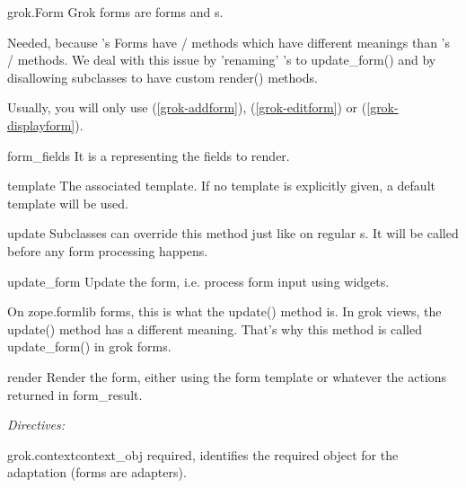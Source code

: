     \begin{classdesc*}{grok.Form}
        Grok forms are  forms and
        s.

        Needed, because 's
        Forms have / methods which have
        different meanings than 's
        / methods.  We deal with this issue
        by 'renaming' 's  to
        update_form() and by disallowing subclasses to have custom
        render() methods. 

        Usually, you will only use 
        (\ref{grok-addform}), 
        (\ref{grok-editform}) or 
        (\ref{grok-displayform}).


        \begin{memberdesc}{form_fields}
          It is a  representing the fields to
          render.
        \end{memberdesc}

        \begin{memberdesc}{template}
            The associated template. If no template is explicitly
            given, a default template will be used.
        \end{memberdesc}

        \begin{methoddesc}{update}{}
          Subclasses can override this method just like on regular
          s. It will be called before any form
          processing happens.
        \end{methoddesc}

        \begin{methoddesc}{update_form}{}
          Update the form, i.e. process form input using widgets.

          On zope.formlib forms, this is what the update() method is.
          In grok views, the update() method has a different meaning.
          That's why this method is called update_form() in grok
          forms.
        \end{methoddesc}

        \begin{methoddesc}{render}{}
          Render the form, either using the form template or whatever
          the actions returned in form_result.
        \end{methoddesc}

        \emph{Directives:}

        \begin{methoddesc}{grok.context}{context_obj}
            required, identifies the required object for the
            adaptation (forms are adapters).
        \end{methoddesc}

    \end{classdesc*}


